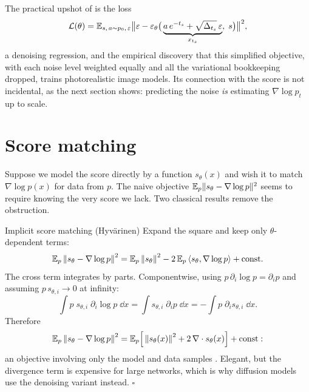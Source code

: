 The practical upshot of \citet{ho2020denoising} is the loss
\begin{equation}
  \mathcal{L}(\theta)
  = \mathbb{E}_{s,\, a \sim p_0,\, \varepsilon}
    \big\| \varepsilon - \varepsilon_\theta\big(
      \underbrace{a\,e^{-t_s} + \sqrt{\Delta_{t_s}}\,\varepsilon}_{x_{t_s}},\; s
    \big) \big\|^2 ,
  \label{eq:ddpm-loss}
\end{equation}
a denoising regression, and the empirical discovery that this simplified
objective, with each noise level weighted equally and all the variational
bookkeeping dropped, trains photorealistic image models. Its connection
with the score is not incidental, as the next section shows: predicting
the noise \emph{is} estimating $\nabla \log p_t$ up to scale.

\section{Score matching}\label{sec:score-matching}

Suppose we model the score directly by a function $s_\theta(x)$ and wish
it to match $\nabla \log p(x)$ for data from $p$. The naive objective
$\mathbb{E}_p \| s_\theta - \nabla \log p \|^2$ seems to require knowing the very
score we lack. Two classical results remove the obstruction.

\begin{toolbox}{Implicit score matching (Hyv\"arinen)}
Expand the square and keep only $\theta$-dependent terms:
\begin{equation*}
  \mathbb{E}_p \left\lVert s_\theta - \nabla \log p \right\rVert^2
  = \mathbb{E}_p \left\lVert s_\theta \right\rVert^2
  - 2\, \mathbb{E}_p \left\langle s_\theta, \nabla \log p \right\rangle
  + \text{const}.
\end{equation*}
The cross term integrates by parts. Componentwise, using
$p\,\partial_i \log p = \partial_i p$ and assuming
$p\, s_{\theta,i} \to 0$ at infinity:
\begin{equation*}
  \int p\; s_{\theta,i}\; \partial_i \log p \;\dd x
  = \int s_{\theta,i}\; \partial_i p \;\dd x
  = - \int p\; \partial_i s_{\theta,i} \;\dd x .
\end{equation*}
Therefore
\begin{equation*}
  \mathbb{E}_p \left\lVert s_\theta - \nabla \log p \right\rVert^2
  = \mathbb{E}_p\Big[ \left\lVert s_\theta(x) \right\rVert^2
    + 2\, \nabla \cdot s_\theta(x) \Big] + \text{const} :
\end{equation*}
an objective involving only the model and data samples
\citep{hyvarinen2005estimation}. Elegant, but the divergence term is
expensive for large networks, which is why diffusion models use the
denoising variant instead. \hfill$\square$
\end{toolbox}

